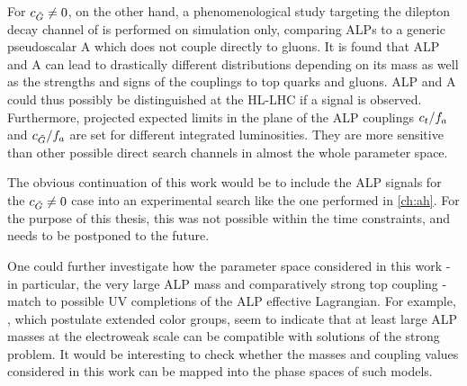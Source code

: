 For $c_{\tilde{G}} \neq 0$, on the other hand, a phenomenological study targeting the dilepton decay channel of \ttbar is performed on simulation only, comparing ALPs to a generic pseudoscalar A which does not couple directly to gluons. It is found that ALP and A can lead to drastically different \mtt distributions depending on its mass as well as the strengths and signs of the couplings to top quarks and gluons. ALP and A could thus possibly be distinguished at the HL-LHC if a signal is observed. Furthermore, projected expected limits in the plane of the ALP couplings $c_t/f_a$ and $c_{\tilde{G}}/f_a$ are set for different integrated luminosities. They are more sensitive than other possible direct search channels in almost the whole parameter space.

The obvious continuation of this work would be to include the ALP signals for the $c_{\tilde{G}} \neq 0$ case into an experimental search like the one performed in \cref{ch:ah}. For the purpose of this thesis, this was not possible within the time constraints, and needs to be postponed to the future. 

One could further investigate how the parameter space considered in this work - in particular, the very large ALP mass and comparatively strong top coupling - match to possible UV completions of the ALP effective Lagrangian. For example, , which postulate extended color groups, seem to indicate that at least large ALP masses at the electroweak scale can be compatible with solutions of the strong \CP problem. It would be interesting to check whether the masses and coupling values considered in this work can be mapped into the phase spaces of such models. %